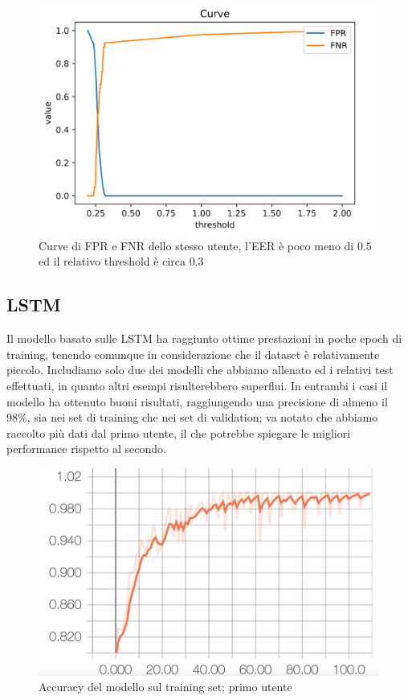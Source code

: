 \documentclass[8pt,notitlepage]{report}
\begin{document}
			\begin{figure}[H]
				\begin{center}
					\includegraphics[scale=.35]{fpr_fnr_FDTW_Dario}
					\caption{Curve di FPR e FNR dello stesso utente, l'EER è poco meno di $ 0.5 $ ed il relativo threshold è circa $ 0.3 $}
				\end{center}
			\end{figure}

		
		\subsection{LSTM}
		
			Il modello basato sulle LSTM ha raggiunto ottime prestazioni in poche epoch di training, tenendo comunque in considerazione che il dataset è relativamente piccolo. Includiamo solo due dei modelli che abbiamo allenato ed i relativi test effettuati, in quanto altri esempi risulterebbero superflui. In entrambi i casi il modello ha ottenuto buoni risultati, raggiungendo una precisione di almeno il 98\%, sia nei set di training che nei set di validation; va notato che abbiamo raccolto più dati dal primo utente, il che potrebbe spiegare le migliori performance rispetto al secondo. 
			\begin{figure}[H]
				\begin{center}
					\includegraphics[scale=.1865]{acc_Antonio}
					\caption{Accuracy del modello sul training set; primo utente}
					\label{fig:acc_train_Antonio}
				\end{center}
			\end{figure}
			
\end{document}
